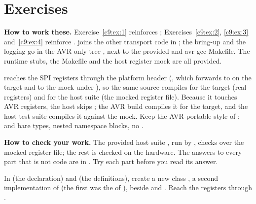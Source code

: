 
\section{Exercises}
\label{c9:sec:exercises}\label{c9:app:c}

\begin{aside}
\textbf{How to work these.} Exercise~\ref{c9:ex:1} reinforces ;
Exercises~\ref{c9:ex:2}, \ref{c9:ex:3} and~\ref{c9:ex:4} reinforce .
 joins the other transport code in ; the bring-up 
and the logging go in the AVR-only tree , next to the provided  and
avr-gcc Makefile. The runtime stubs, the Makefile and the host register mock are all provided.

 reaches the SPI registers through the platform header
(, which forwards to  on the target and to the mock
under ), so the same source compiles for the target (real registers) and for the
host suite (the mocked register file). Because it touches AVR registers, the host 
skips ; the AVR build compiles it for the target, and the host test suite compiles
it against the mock. Keep the AVR-portable style of :  and bare types,
nested namespace blocks, no \code{[[nodiscard]]}.

\textbf{How to check your work.} The provided host suite ,
run by , checks  over the mocked register file; the rest is checked on
the hardware. The answers to every part that is not code are in . Try each part
before you read its answer.
\end{aside}

\label{c9:ex:1}

 In  (the declaration) and
 (the definitions), create a new class , a
second implementation of  (the first was the  of
), beside  and . Reach the registers through
.

